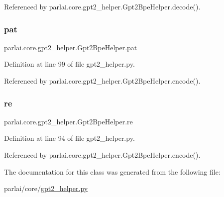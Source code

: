 Referenced by parlai.\+core.\+gpt2\+\_\+helper.\+Gpt2\+Bpe\+Helper.\+decode().

\mbox{\label{classparlai_1_1core_1_1gpt2__helper_1_1Gpt2BpeHelper_afbdbf5259b69f21f389eecaaada838d8}} 
\subsubsection{\texorpdfstring{pat}{pat}}
{\footnotesize\ttfamily parlai.\+core.\+gpt2\+\_\+helper.\+Gpt2\+Bpe\+Helper.\+pat}



Definition at line 99 of file gpt2\+\_\+helper.\+py.



Referenced by parlai.\+core.\+gpt2\+\_\+helper.\+Gpt2\+Bpe\+Helper.\+encode().

\mbox{\label{classparlai_1_1core_1_1gpt2__helper_1_1Gpt2BpeHelper_ac1ad446c51c26831655244d83350589a}} 
\subsubsection{\texorpdfstring{re}{re}}
{\footnotesize\ttfamily parlai.\+core.\+gpt2\+\_\+helper.\+Gpt2\+Bpe\+Helper.\+re}



Definition at line 94 of file gpt2\+\_\+helper.\+py.



Referenced by parlai.\+core.\+gpt2\+\_\+helper.\+Gpt2\+Bpe\+Helper.\+encode().



The documentation for this class was generated from the following file\+:\begin{DoxyCompactItemize}
\item 
parlai/core/\hyperlink{gpt2__helper_8py}{gpt2\+\_\+helper.\+py}\end{DoxyCompactItemize}
